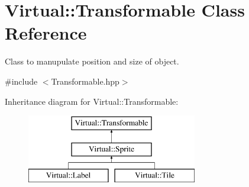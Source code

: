 \hypertarget{class_virtual_1_1_transformable}{}\section{Virtual\+:\+:Transformable Class Reference}
\label{class_virtual_1_1_transformable}


Class to manupulate position and size of object.  




{\ttfamily \#include $<$Transformable.\+hpp$>$}

Inheritance diagram for Virtual\+:\+:Transformable\+:\begin{figure}[H]
\begin{center}
\leavevmode
\includegraphics[height=3.000000cm]{class_virtual_1_1_transformable}
\end{center}
\end{figure}
